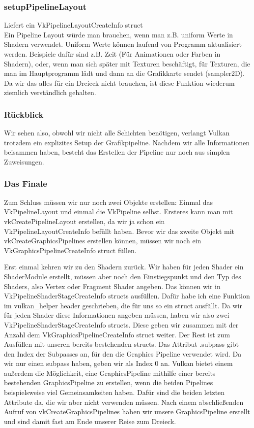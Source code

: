 \documentclass[11pt,a4paper]{report}
\begin{document}
\subsubsection{setupPipelineLayout}
Liefert ein VkPipelineLayoutCreateInfo struct\\
Ein Pipeline Layout würde man brauchen, wenn man z.B. uniform Werte in Shadern verwendet. Uniform Werte können laufend von Programm aktualisiert werden. Beispiele dafür sind z.B. Zeit (Für Animationen oder Farben in Shadern), oder, wenn man sich später mit Texturen beschäftigt, für Texturen, die man im Hauptprogramm lädt und dann an die Grafikkarte sendet (sampler2D). Da wir das alles für ein Dreieck nicht brauchen, ist diese Funktion wiederum ziemlich verständlich gehalten.

\subsubsection{Rückblick}
Wir sehen also, obwohl wir nicht alle Schichten benötigen, verlangt Vulkan trotzdem ein explizites Setup der Grafikpipeline. Nachdem wir alle Informationen beisammen haben, besteht das Erstellen der Pipeline nur noch aus simplen Zuweisungen.

\subsubsection{Das Finale}
Zum Schluss müssen wir nur noch zwei Objekte erstellen: Einmal das VkPipelineLayout und einmal die VkPipeline selbst. Ersteres kann man mit vkCreatePipelineLayout erstellen, da wir ja schon ein VkPipelineLayoutCreateInfo befüllt haben. Bevor wir das zweite Objekt mit vkCreateGraphicsPipelines erstellen können, müssen wir noch ein VkGraphicsPipelineCreateInfo struct füllen.

Erst einmal kehren wir zu den Shadern zurück. Wir haben für jeden Shader ein ShaderModule erstellt, müssen aber noch den Einstiegspunkt und den Typ des Shaders, also Vertex oder Fragment Shader angeben. Das können wir in VkPipelineShaderStageCreateInfo structs ausfüllen. Dafür habe ich eine Funktion im vulkan\_helper header geschrieben, die für uns so ein struct ausfüllt. Da wir für jeden Shader diese Informationen angeben müssen, haben wir also zwei VkPipelineShaderStageCreateInfo structs. Diese geben wir zusammen mit der Anzahl dem VkGraphicsPipelineCreateInfo struct weiter. Der Rest ist zum Ausfüllen mit unseren bereits bestehenden structs. Das Attribut .subpass gibt den Index der Subpasses an, für den die Graphics Pipeline verwendet wird. Da wir nur einen subpass haben, geben wir als Index 0 an. Vulkan bietet einem außerdem die Möglichkeit, eine GraphicsPipeline mithilfe einer bereits bestehenden GraphicsPipeline zu erstellen, wenn die beiden Pipelines beispielsweise viel Gemeinsamkeiten haben. Dafür sind die beiden letzten Attribute da, die wir aber nicht verwenden müssen. 
Nach einem abschließenden Aufruf von vkCreateGraphicsPipelines haben wir unsere GraphicsPipeline erstellt und sind damit fast am Ende unserer Reise zum Dreieck.
\end{document}
